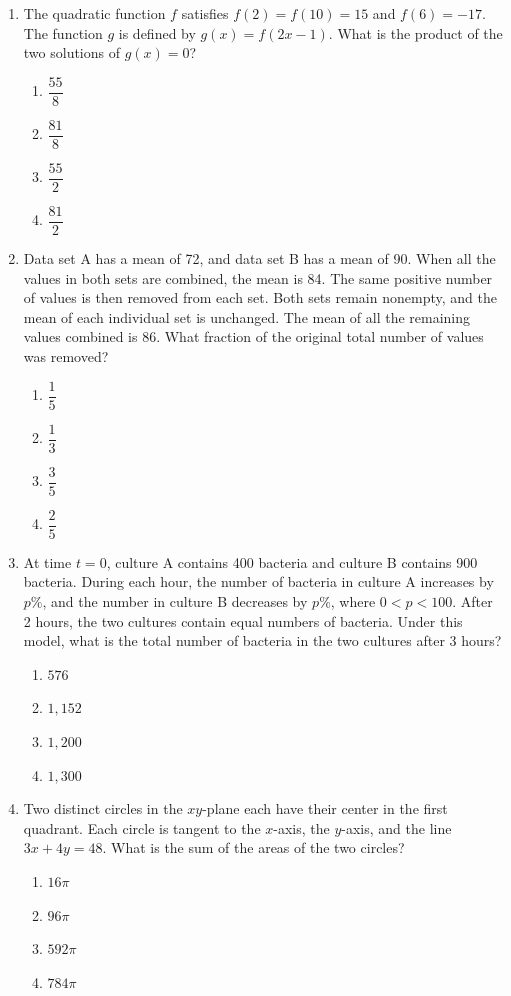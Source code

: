 \documentclass[12pt]{article}
\begin{document}
\begin{enumerate}[leftmargin=*,itemsep=1em]
  \item The quadratic function $f$ satisfies $f(2)=f(10)=15$ and $f(6)=-17$. The function $g$ is defined by $g(x)=f(2x-1)$. What is the product of the two solutions of $g(x)=0$?
  \begin{enumerate}[label=\Alph*.,itemsep=0pt]
    \item $\dfrac{55}{8}$
    \item $\dfrac{81}{8}$
    \item $\dfrac{55}{2}$
    \item $\dfrac{81}{2}$
  \end{enumerate}

  \vfill
  \item Data set A has a mean of 72, and data set B has a mean of 90. When all the values in both sets are combined, the mean is 84. The same positive number of values is then removed from each set. Both sets remain nonempty, and the mean of each individual set is unchanged. The mean of all the remaining values combined is 86. What fraction of the original total number of values was removed?
  \begin{enumerate}[label=\Alph*.,itemsep=0pt]
    \item $\dfrac15$
    \item $\dfrac13$
    \item $\dfrac35$
    \item $\dfrac25$
  \end{enumerate}

  \vfill
  \newpage
  \item At time $t=0$, culture A contains 400 bacteria and culture B contains 900 bacteria. During each hour, the number of bacteria in culture A increases by $p\%$, and the number in culture B decreases by $p\%$, where $0<p<100$. After 2 hours, the two cultures contain equal numbers of bacteria. Under this model, what is the total number of bacteria in the two cultures after 3 hours?
  \begin{enumerate}[label=\Alph*.,itemsep=0pt]
    \item $576$
    \item $1{,}152$
    \item $1{,}200$
    \item $1{,}300$
  \end{enumerate}

  \vfill
  \item Two distinct circles in the $xy$-plane each have their center in the first quadrant. Each circle is tangent to the $x$-axis, the $y$-axis, and the line $3x+4y=48$. What is the sum of the areas of the two circles?
  \begin{enumerate}[label=\Alph*.,itemsep=0pt]
    \item $16\pi$
    \item $96\pi$
    \item $592\pi$
    \item $784\pi$
  \end{enumerate}


\end{enumerate}
\end{document}
